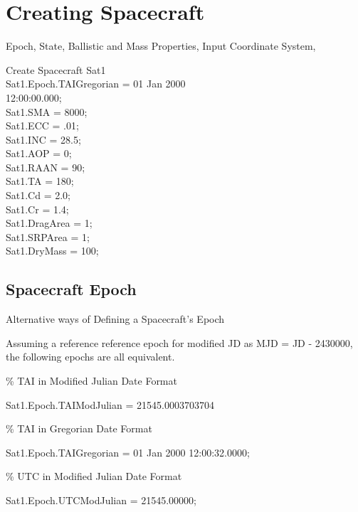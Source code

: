 \chapter{Creating Spacecraft}

Epoch, State, Ballistic and Mass Properties, Input Coordinate
System,


\noindent\begin{ScriptType} \noindent
Create Spacecraft Sat1\\
Sat1.Epoch.TAIGregorian  = 01 Jan 2000\\
12:00:00.000; \\
Sat1.SMA        = 8000; \\
Sat1.ECC        = .01;\\
Sat1.INC        = 28.5;\\
Sat1.AOP        = 0;\\
Sat1.RAAN = 90;\\
Sat1.TA         = 180;\\     %
Sat1.Cd         = 2.0;\\
Sat1.Cr         = 1.4;\\
Sat1.DragArea   = 1;\\
Sat1.SRPArea    = 1;\\
Sat1.DryMass    = 100; 
\end{ScriptType}


\section{Spacecraft Epoch}

Alternative ways of Defining a Spacecraft's Epoch

Assuming a reference reference epoch for modified JD as MJD = JD -
2430000, the following epochs are all equivalent.

\noindent \% TAI in Modified Julian Date Format\\
 \begin{ScriptType}
Sat1.Epoch.TAIModJulian = 21545.0003703704 \end{ScriptType}

\noindent \% TAI in Gregorian Date Format\\
\begin{ScriptType} Sat1.Epoch.TAIGregorian  = 01 Jan
2000 12:00:32.0000;\end{ScriptType}

\noindent \% UTC in Modified Julian Date Format\\
  \begin{ScriptType}
 Sat1.Epoch.UTCModJulian  =
21545.00000; \end{ScriptType}

